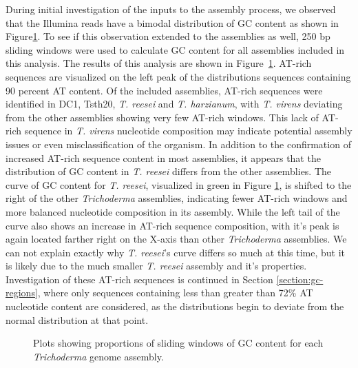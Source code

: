 During initial investigation of the inputs to the assembly process, we
observed that the Illumina reads have a bimodal distribution of GC
content as shown in Figure\ref{fig:assembly-gc}. To see if this
observation extended to the assemblies as well, 250 bp sliding windows
were used to calculate GC content for all assemblies included in this
analysis. The results of this analysis are shown in
Figure~\ref{fig:assembly-gc}. AT-rich sequences are visualized on the
left peak of the distributions sequences containing 90 percent AT
content. Of the included assemblies, AT-rich sequences were identified
in DC1, Tsth20, \textit{T. reesei} and \textit{T. harzianum}, with
\textit{T. virens} deviating from the other assemblies showing very
few AT-rich windows. This lack of AT-rich sequence in
\textit{T. virens} nucleotide composition may indicate potential
assembly issues or even misclassification of the organism. In addition
to the confirmation of increased AT-rich sequence content in most
assemblies, it appears that the distribution of GC content in
\textit{T. reesei} differs from the other assemblies. The curve of GC
content for \textit{T. reesei}, visualized in green in Figure
\ref{fig:assembly-gc}, is shifted to the right of the other
\textit{Trichoderma} assemblies, indicating fewer AT-rich windows and
more balanced nucleotide composition in its assembly. While the left
tail of the curve also shows an increase in AT-rich sequence
composition, with it's peak is again located farther right on the
X-axis than other \textit{Trichoderma} assemblies. We can not explain
exactly why \textit{T. reesei}'s curve differs so much at this time,
but it is likely due to the much smaller \textit{T. reesei} assembly
and it's properties. Investigation of these AT-rich sequences is
continued in Section \ref{section:gc-regions}, where only sequences
containing less than greater than 72\% AT nucleotide content are
considered, as the distributions begin to deviate from the normal
distribution at that point.

\begin{figure}
  \begin{center}
  \end{center}
  \caption{Plots showing proportions of sliding windows of GC content
    for each \textit{Trichoderma} genome assembly.}
  \label{fig:assembly-gc}
\end{figure}



